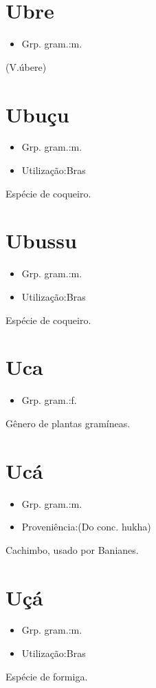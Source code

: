\documentclass{article}
\begin{document}
\section{Ubre}
\begin{itemize}
\item {Grp. gram.:m.}
\end{itemize}
(V.úbere)
\section{Ubuçu}
\begin{itemize}
\item {Grp. gram.:m.}
\end{itemize}
\begin{itemize}
\item {Utilização:Bras}
\end{itemize}
Espécie de coqueiro.
\section{Ubussu}
\begin{itemize}
\item {Grp. gram.:m.}
\end{itemize}
\begin{itemize}
\item {Utilização:Bras}
\end{itemize}
Espécie de coqueiro.
\section{Uca}
\begin{itemize}
\item {Grp. gram.:f.}
\end{itemize}
Gênero de plantas gramíneas.
\section{Ucá}
\begin{itemize}
\item {Grp. gram.:m.}
\end{itemize}
\begin{itemize}
\item {Proveniência:(Do conc. \textunderscore hukha\textunderscore )}
\end{itemize}
Cachimbo, usado por Banianes.
\section{Uçá}
\begin{itemize}
\item {Grp. gram.:m.}
\end{itemize}
\begin{itemize}
\item {Utilização:Bras}
\end{itemize}
Espécie de formiga.
\end{document}
